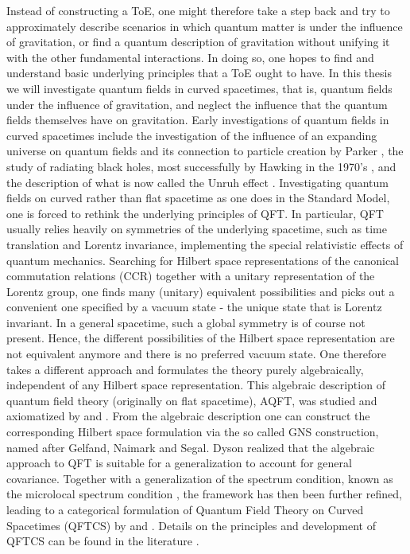 Instead of constructing a ToE, one might therefore take a step back and try to approximately describe scenarios in which quantum matter is under the influence of gravitation, or find a quantum description of gravitation without unifying it with the other fundamental interactions. In doing so, one hopes to find and understand basic underlying principles that a ToE ought to have. In this thesis we will investigate quantum fields in curved spacetimes, that is, quantum fields under the influence of gravitation, and neglect the influence that the quantum fields themselves have on gravitation. Early investigations of quantum fields in curved spacetimes include the investigation of the influence of an expanding universe on quantum fields and its connection to particle creation by Parker \cite{Parker1969}, the study of radiating black holes, most successfully by Hawking in the 1970's \cite{Hawking1975}, and the description of what is now called the Unruh effect \cite{Unruh1976}. Investigating quantum fields on curved rather than flat spacetime as one does in the Standard Model, one is forced to rethink the underlying principles of QFT. In particular, QFT usually relies heavily on symmetries of the underlying spacetime, such as time translation and Lorentz invariance, implementing the special relativistic effects of quantum mechanics. Searching for Hilbert space representations of the canonical commutation relations (CCR) together with a unitary representation of the Lorentz group, one finds many (unitary) equivalent possibilities and picks out a convenient one specified by a vacuum state - the unique state that is Lorentz invariant.  In a general spacetime, such a global symmetry is of course not present. Hence, the different possibilities of the Hilbert space representation are not equivalent anymore and there is no preferred vacuum state. One therefore takes a different approach and formulates the theory purely algebraically, independent of any Hilbert space representation. This algebraic description of quantum field theory (originally on flat spacetime), AQFT, was studied and axiomatized by  and  \cite{HaagKastler1964}. From the algebraic description one can construct the corresponding Hilbert space formulation via the so called GNS construction, named after Gelfand, Naimark and Segal. Dyson \cite{dyson1972} realized that the algebraic approach to QFT is suitable for a generalization to account for general covariance. Together with a generalization of the spectrum condition, known as the microlocal spectrum condition \cite{Brunetti1996}, the framework has then been further refined, leading to a categorical formulation of Quantum Field Theory on Curved Spacetimes (QFTCS) by  and  \cite{Brunetti_Fredenhagen_Verch}. Details on the principles and development of QFTCS can be found in the literature \cite{wald_QFT,baer_ginoux_pfaeffle,wald_hollands_review}.\par
